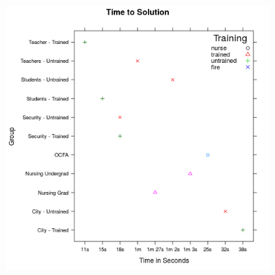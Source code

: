 \documentclass{article}
\begin{document}
\includegraphics[width = 10cm]{Airway_Time.png}
\end{document}
